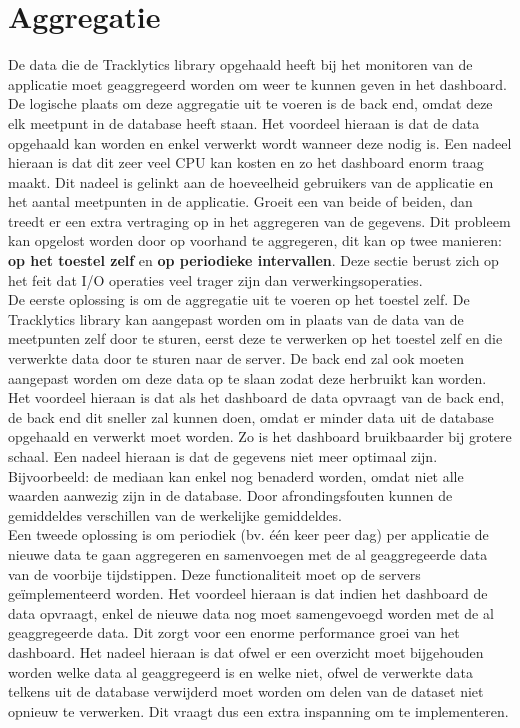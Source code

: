 \section{Aggregatie}
De data die de Tracklytics library opgehaald heeft bij het monitoren van de applicatie moet geaggregeerd worden om weer te kunnen geven in het dashboard. De logische plaats om deze aggregatie uit te voeren is de back end, omdat deze elk meetpunt in de database heeft staan. Het voordeel hieraan is dat de data opgehaald kan worden en enkel verwerkt wordt wanneer deze nodig is. Een nadeel hieraan is dat dit zeer veel CPU kan kosten en zo het dashboard enorm traag maakt. Dit nadeel is gelinkt aan de hoeveelheid gebruikers van de applicatie en het aantal meetpunten in de applicatie. Groeit een van beide of beiden, dan treedt er een extra vertraging op in het aggregeren van de gegevens. Dit probleem kan opgelost worden door op voorhand te aggregeren, dit kan op twee manieren: \textbf{op het toestel zelf} en \textbf{op periodieke intervallen}. Deze sectie berust zich op het feit dat I/O operaties veel trager zijn dan verwerkingsoperaties.\\

De eerste oplossing is om de aggregatie uit te voeren op het toestel zelf. De Tracklytics library kan aangepast worden om in plaats van de data van de meetpunten zelf door te sturen, eerst deze te verwerken op het toestel zelf en die verwerkte data door te sturen naar de server. De back end zal ook moeten aangepast worden om deze data op te slaan zodat deze herbruikt kan worden. Het voordeel hieraan is dat als het dashboard de data opvraagt van de back end, de back end dit sneller zal kunnen doen, omdat er minder data uit de database opgehaald en verwerkt moet worden. Zo is het dashboard bruikbaarder bij grotere schaal. Een nadeel hieraan is dat de gegevens niet meer optimaal zijn. Bijvoorbeeld: de mediaan kan enkel nog benaderd worden, omdat niet alle waarden aanwezig zijn in de database. Door afrondingsfouten kunnen de gemiddeldes verschillen van de werkelijke gemiddeldes. \\

Een tweede oplossing is om periodiek (bv. \'e\'en keer peer dag) per applicatie de nieuwe data te gaan aggregeren en samenvoegen met de al geaggregeerde data van de voorbije tijdstippen. Deze functionaliteit moet op de servers ge\"implementeerd worden. Het voordeel hieraan is dat indien het dashboard de data opvraagt, enkel de nieuwe data nog moet samengevoegd worden met de al geaggregeerde data. Dit zorgt voor een enorme performance groei van het dashboard. Het nadeel hieraan is dat ofwel er een overzicht moet bijgehouden worden welke data al geaggregeerd is en welke niet, ofwel de verwerkte data telkens uit de database verwijderd moet worden om delen van de dataset niet opnieuw te verwerken. Dit vraagt dus een extra inspanning om te implementeren. \\

